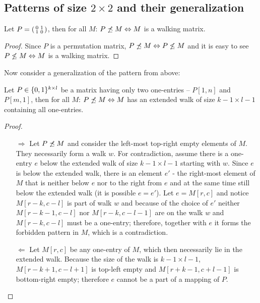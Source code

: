 \subsection{Patterns of size $2\times2$ and their generalization}
\begin{thm}
Let $P=\left(\begin{smallmatrix}0&1\\1&0\end{smallmatrix}\right)$, then for all $M$: $P\not\preceq M\Leftrightarrow M$ is a walking matrix.
\end{thm}
\begin{proof}
Since $P$ is a permutation matrix, $P\not\preceq M\Leftrightarrow P\not\leq M$ and it is easy to see $P\not\leq M\Leftrightarrow M$ is a walking matrix.
\end{proof}

Now consider a generalization of the pattern from above:
\begin{thm}
Let $P\in\{0,1\}^{k\times l}$ be a matrix having only two one-entries -- $P[1,n]$ and $P[m,1]$, then for all $M$: $P\not\preceq M\Leftrightarrow M$ has an extended walk of size $k-1\times l-1$ containing all one-entries.
\end{thm}
\begin{proof}
\begin{itemize}
\item[$\Rightarrow$] Let $P\not\preceq M$ and consider the left-most top-right empty elements of $M$. They necessarily form a walk $w$. For contradiction, assume there is a one-entry $e$ below the extended walk of size $k-1\times l-1$ starting with $w$. Since $e$ is below the extended walk, there is an element $e'$ - the right-most element of $M$ that is neither below $e$ nor to the right from $e$ and at the same time still below the extended walk (it is possible $e=e'$). Let $e=M[r,c]$ and notice $M[r-k,c-l]$ is part of walk $w$ and because of the choice of $e'$ neither $M[r-k-1,c-l]$ nor $M[r-k,c-l-1]$ are on the walk $w$ and $M[r-k,c-l]$ must be a one-entry; therefore, together with $e$ it forms the forbidden pattern in $M$, which is a contradiction.
\item[$\Leftarrow$] Let $M[r,c]$ be any one-entry of $M$, which then necessarily lie in the extended walk. Because the size of the walk is $k-1\times l-1$, $M[r-k+1,c-l+1]$ is top-left empty and $M[r+k-1,c+l-1]$ is bottom-right empty; therefore $e$ cannot be a part of a mapping of $P$. 
\end{itemize}
\end{proof}

